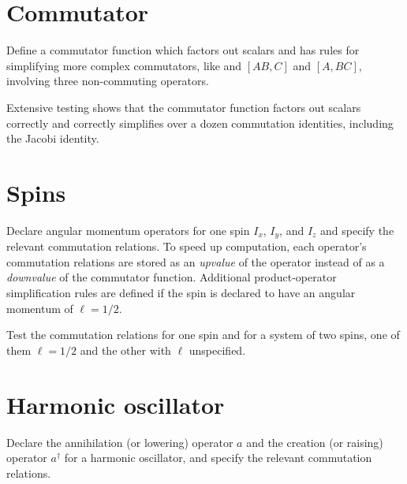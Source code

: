 \documentclass[12pt,letterpaper]{refart}
\begin{document}


\section{Commutator}

Define a commutator function which factors out scalars and has rules for simplifying more complex commutators, like and $[A B, C]$ and $[A, B C]$, involving three non-commuting operators.



Extensive testing shows that the commutator function factors out scalars correctly and correctly simplifies over a dozen commutation identities, including the Jacobi identity.



\section{Spins}

Declare angular momentum operators for one spin $I_x$, $I_y$, and $I_z$ and specify the relevant commutation relations.
To speed up computation, each operator's commutation relations are stored as an \emph{upvalue} of the operator instead of as a \emph{downvalue} of the commutator function.
Additional product-operator simplification rules are defined if the spin is declared to have an angular momentum of $\ell = 1/2$.



Test the commutation relations for one spin and for a system of two spins, one of them $\ell = 1/2$ and the other with $\ell$ unspecified.



\section{Harmonic oscillator}

Declare the annihilation (or lowering) operator $a$ and the creation (or raising) operator $a^{\dagger}$ for a harmonic oscillator, and specify the relevant commutation relations.
\end{document}
